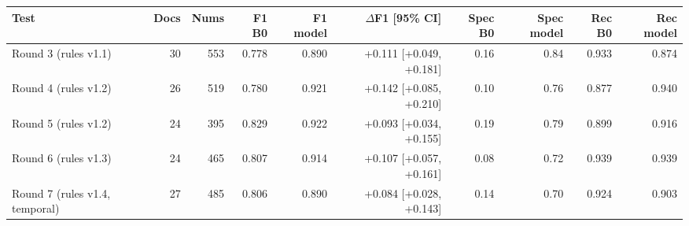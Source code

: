 \begin{tabular}{lrrrrrrrrr}
\toprule
Test & Docs & Nums & F1 B0 & F1 model & $\Delta$F1 [95\% CI] & Spec B0 & Spec model & Rec B0 & Rec model \\
\midrule
Round 3 (rules v1.1) & 30 & 553 & 0.778 & 0.890 & +0.111 [+0.049, +0.181] & 0.16 & 0.84 & 0.933 & 0.874 \\
Round 4 (rules v1.2) & 26 & 519 & 0.780 & 0.921 & +0.142 [+0.085, +0.210] & 0.10 & 0.76 & 0.877 & 0.940 \\
Round 5 (rules v1.2) & 24 & 395 & 0.829 & 0.922 & +0.093 [+0.034, +0.155] & 0.19 & 0.79 & 0.899 & 0.916 \\
Round 6 (rules v1.3) & 24 & 465 & 0.807 & 0.914 & +0.107 [+0.057, +0.161] & 0.08 & 0.72 & 0.939 & 0.939 \\
Round 7 (rules v1.4, temporal) & 27 & 485 & 0.806 & 0.890 & +0.084 [+0.028, +0.143] & 0.14 & 0.70 & 0.924 & 0.903 \\
\bottomrule
\end{tabular}
